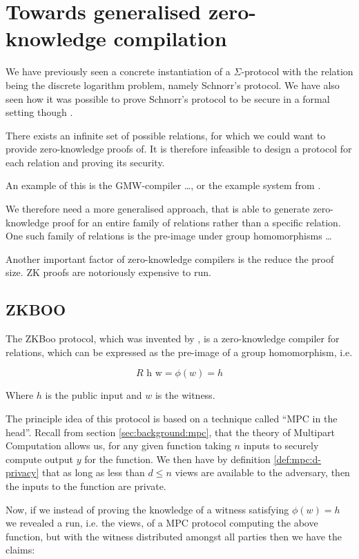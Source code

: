 \chapter{Towards generalised zero-knowledge compilation}
\label{ch:general_zk}
We have previously seen a concrete instantiation of a $\Sigma$-protocol with the
relation being the discrete logarithm problem, namely Schnorr's protocol. We
have also seen how it was possible to prove Schnorr's protocol to be secure in a
formal setting though \easycrypt.

There exists an infinite set of possible relations, for which we could want to
provide zero-knowledge proofs of. It is therefore infeasible to design a
protocol for each relation and proving its security.

An example of this is the GMW-compiler \dots, or the example system from \cite{zkcrypt}.

We therefore need a more generalised approach, that is able to generate
zero-knowledge proof for an entire family of relations rather than a specific relation.
One such family of relations is the pre-image under group homomorphisms \dots

Another important factor of zero-knowledge compilers is the reduce the proof
size. ZK proofs are notoriously expensive to run.

\section{ZKBOO}
\label{sec:zkboo}
The ZKBoo protocol, which was invented by \citet{zkboo}, is a zero-knowledge compiler for relations, which can be
expressed as the pre-image of a group homomorphism, i.e.

\[
  R \text{ h w} = \phi(w) = h
\]

Where $h$ is the public input and $w$ is the witness.

The principle idea of this protocol is based on a technique called ``MPC in the
head''. Recall from section \ref{sec:background:mpc}, that the theory of
Multipart Computation allows us, for any given function taking $n$ inputs to
securely compute output $y$ for the function. We then have by definition
\ref{def:mpc:d-privacy} that as long as less than $d \leq n$ views are available to the adversary, then the inputs to the function are private.

Now, if we instead of proving the knowledge of a witness satisfying $\phi(w) = h$
we revealed a run, i.e. the views, of a MPC protocol computing the above
function, but with the witness distributed amongst all parties then we have the
claims:

